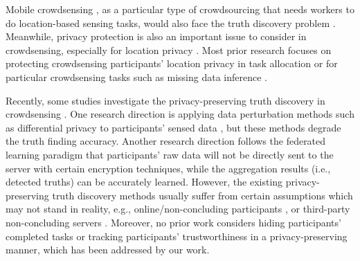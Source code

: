 \documentclass[11pt]{article}
\begin{document}
Mobile crowdsensing \cite{Leye-zhang20144w1h}, as a particular type of crowdsourcing that needs workers to do location-based sensing tasks, would also face the truth discovery problem \cite{Leye-Wang2014SurrogateMS}. Meanwhile, privacy protection is also an important issue to consider in crowdsensing, especially for location privacy \cite{Leye-han2021hidden,Leye-wang2016differential,Leye-Wang2017LocationPT,Leye-Wang2019PersonalizedPT,Leye-Wang2020SparseMC,Leye-Wang2019MobileCT}. Most prior research focuses on protecting crowdsensing participants' location privacy in task allocation \cite{Leye-Wang2017LocationPT,Leye-Wang2019PersonalizedPT,Leye-Wang2019MobileCT} or for particular crowdsensing tasks such as missing data inference \cite{Leye-wang2016differential,Leye-Wang2020SparseMC}.

Recently, some studies investigate the privacy-preserving truth discovery in crowdsensing \cite{Leye-Miao2015CloudEnabledPT,Leye-Miao2017ALP,Leye-Miao2019PrivacyPreservingTD,Leye-Zhang2021ReliableAP,Leye-ZHANG2020101848,Leye-Xu2019EfficientAP}. One research direction is applying data perturbation methods such as differential privacy to participants' sensed data \cite{Leye-Li2018AnET,Leye-Li2020TowardsDP}, but these methods degrade the truth finding accuracy. Another research direction follows the federated learning \cite{Leye-yang2019federated} paradigm that participants' raw data will not be directly sent to the server with certain encryption techniques, while the aggregation results (i.e., detected truths) can be accurately learned. However, the existing privacy-preserving truth discovery methods usually suffer from certain assumptions which may not stand in reality, e.g., online/non-concluding participants \cite{Leye-Miao2015CloudEnabledPT,Leye-Miao2017ALP,Leye-Miao2019PrivacyPreservingTD}, or third-party non-concluding servers \cite{Leye-Zhang2021ReliableAP,Leye-ZHANG2020101848}.
Moreover, no prior work considers hiding participants' completed tasks or tracking participants' trustworthiness in a privacy-preserving manner, which has been addressed by our work.
\end{document}
